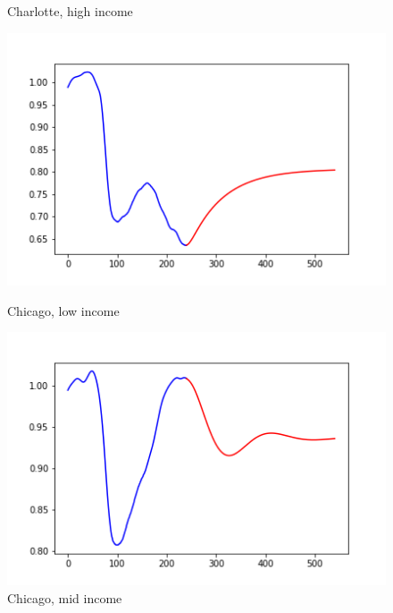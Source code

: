 \documentclass{article}
\begin{document}
\begin{figure}[ht]
\begin{minipage}[b]{0.3\linewidth}
\caption{Charlotte, high income}
\end{minipage}
\end{figure}

\begin{figure}[ht]
\begin{minipage}[b]{0.3\linewidth}
\centering
\includegraphics[width=\textwidth]{Chicago_lowinc_emp.png}
\caption{Chicago, low income}
\end{minipage}
\hspace{0.5cm}
\begin{minipage}[b]{0.3\linewidth}
\centering
\includegraphics[width=\textwidth]{Chicago_midinc_emp.png}
\caption{Chicago, mid income}
\end{minipage}
\hspace{0.5cm}
\begin{minipage}[b]{0.3\linewidth}
\centering

\end{minipage}
\end{figure}
\end{document}
